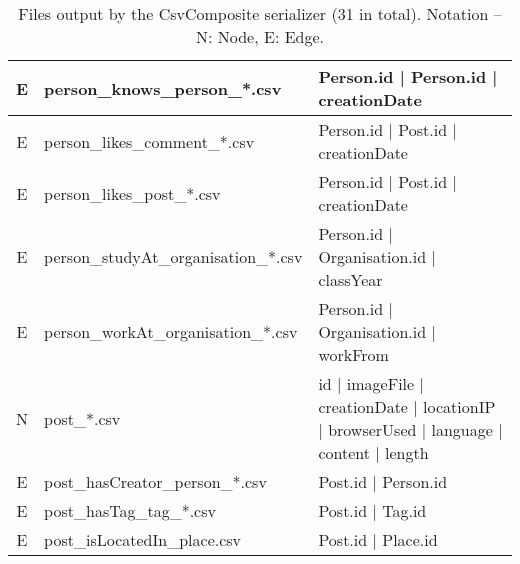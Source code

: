\begin{table}[htb]
\begin{tabular}{|c|p{4.6cm}|p{11.4cm}|}
        E                       & person\_knows\_person\_*.csv            & Person.id | Person.id | creationDate                                                                        \\ \hline
        E                       & person\_likes\_comment\_*.csv           & Person.id | Post.id | creationDate                                                                          \\ \hline
        E                       & person\_likes\_post\_*.csv              & Person.id | Post.id | creationDate                                                                          \\ \hline
        E                       & person\_studyAt\_organisation\_*.csv    & Person.id | Organisation.id | classYear                                                                     \\ \hline
        E                       & person\_workAt\_organisation\_*.csv     & Person.id | Organisation.id | workFrom                                                                      \\ \hline
        N                       & post\_*.csv                             & id | imageFile | creationDate | locationIP | browserUsed | language | content | length                      \\ \hline
        E                       & post\_hasCreator\_person\_*.csv         & Post.id | Person.id                                                                                         \\ \hline
        E                       & post\_hasTag\_tag\_*.csv                & Post.id | Tag.id                                                                                            \\ \hline
        E                       & post\_isLocatedIn\_place.csv            & Post.id | Place.id                                                                                          \\ \hline
    \end{tabular}
    \caption{Files output by the CsvComposite serializer (31 in total). Notation -- N: Node, E: Edge.}
    \label{table:csv_composite}
\end{table}
